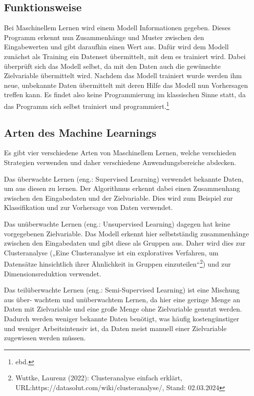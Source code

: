 \documentclass[11pt,oneside]{report}
\begin{document}
\subsection{Funktionsweise}
Bei Maschinellem Lernen wird einem Modell Informationen gegeben. Dieses Programm erkennt nun Zusammenhänge und Muster zwischen den Eingabewerten und gibt daraufhin einen Wert aus. Dafür wird dem Modell zunächst als Training ein Datenset übermittelt, mit dem es trainiert wird. Dabei überprüft sich das Modell selbst, da mit den Daten auch die gewünschte Zielvariable übermittelt wird. Nachdem das Modell trainiert wurde werden ihm neue, unbekannte Daten übermittelt mit deren Hilfe das Modell nun Vorhersagen treffen kann. Es findet also keine Programmierung im klassischen Sinne statt, da das Programm sich selbst trainiert und programmiert.\footnote{ebd.}

\subsection{Arten des Machine Learnings}
Es gibt vier verschiedene Arten von Maschinellem Lernen, welche verschieden Strategien verwenden und daher verschiedene Anwendungsbereiche abdecken.

Das überwachte Lernen (eng.: Supervised Learning) verwendet bekannte Daten, um aus diesen zu lernen. Der Algorithmus erkennt dabei einen Zusammenhang zwischen den Eingabedaten und der Zielvariable. Dies wird zum Beispiel zur Klassifikation und zur Vorhersage von Daten verwendet.

Das unüberwachte Lernen (eng.: Unsupervised Learning) dagegen hat keine vorgegebenen Zielvariable. Das Modell erkennt hier selbstständig zusammenhänge zwischen den Eingabedaten und gibt diese als Gruppen aus. Daher wird dies zur Clusteranalyse („Eine Clusteranalyse ist ein exploratives Verfahren, um Datensätze hinsichtlich ihrer Ähnlichkeit in Gruppen einzuteilen“\footnote{Wuttke, Laurenz (2022): Clusteranalyse einfach erklärt, URL:https://datasolut.com/wiki/clusteranalyse/, Stand: 02.03.2024}) und zur Dimensionsreduktion verwendet.

Das teilüberwachte Lernen (eng.: Semi-Supervised Learning) ist eine Mischung aus über- wachtem und unüberwachtem Lernen, da hier eine geringe Menge an Daten mit Zielvariable und eine große Menge ohne Zielvariable genutzt werden. Dadurch werden weniger bekannte Daten benötigt, was häufig kostengünstiger und weniger Arbeitsintensiv ist, da Daten meist manuell einer Zielvariable zugewiesen werden müssen.
\end{document}
